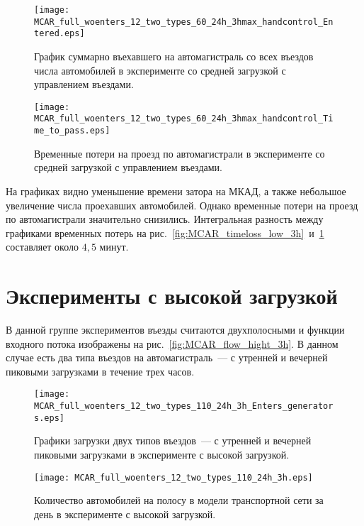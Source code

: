 \begin{figure}[ht]
    \begin{minipage}[b][][b]{0.49\textwidth}
        \centering
        \texttt{[image: MCAR\_full\_woenters\_12\_two\_types\_60\_24h\_3hmax\_handcontrol\_Entered.eps]}
        \caption{График суммарно въехавшего на автомагистраль со всех въездов числа автомобилей в эксперименте со средней загрузкой с управлением въездами.}
        \label{fig:MCAR_entered_low_3h_handcontrol}
    \end{minipage}
    \hfill
    \begin{minipage}[b][][b]{0.49\textwidth}
        \centering
        \texttt{[image: MCAR\_full\_woenters\_12\_two\_types\_60\_24h\_3hmax\_handcontrol\_Time\_to\_pass.eps]}
        \caption{Временные потери на проезд по автомагистрали в эксперименте со средней загрузкой с управлением въездами.}
        \label{fig:MCAR_timeloss_low_3h_handcontrol}
    \end{minipage}
\end{figure}

На графиках видно уменьшение времени затора на МКАД, а также небольшое увеличение числа проехавших автомобилей.
Однако временные потери на проезд по автомагистрали значительно снизились.
Интегральная разность между графиками временных потерь на рис.~\ref{fig:MCAR_timeloss_low_3h}~и~\ref{fig:MCAR_timeloss_low_3h_handcontrol} составляет около $4,5$ минут.


\section{Эксперименты с высокой загрузкой}
\label{sec:ch5/hight}
В данной группе экспериментов въезды считаются двухполосными и функции входного потока изображены на рис.~\ref{fig:MCAR_flow_hight_3h}.
В данном случае есть два типа въездов на автомагистраль~--- с утренней и вечерней пиковыми загрузками в течение трех часов.
\begin{figure}[ht]
    \begin{minipage}[b][][b]{0.49\textwidth}
        \centering
        \texttt{[image: MCAR\_full\_woenters\_12\_two\_types\_110\_24h\_3h\_Enters\_generators.eps]}
        \caption{Графики загрузки двух типов въездов~--- с утренней и вечерней пиковыми загрузками в эксперименте с высокой загрузкой.}
        \label{fig:MCAR_flow_hight_3h}
    \end{minipage}
    \hfill
    \begin{minipage}[b][][b]{0.49\textwidth}
        \centering
        \texttt{[image: MCAR\_full\_woenters\_12\_two\_types\_110\_24h\_3h.eps]}
        \caption{Количество автомобилей на полосу в модели транспортной сети за день в эксперименте с высокой загрузкой.}
        \label{fig:MCAR_heatmap_hight_3h}
    \end{minipage}
\end{figure}

